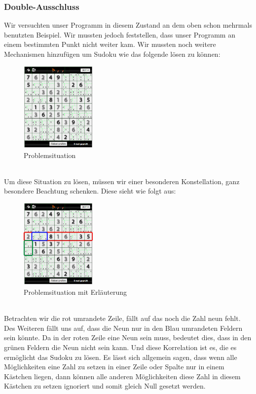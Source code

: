 \documentclass[11pt,a4paper]{article}
\begin{document}
\subsubsection{Double-Ausschluss}
Wir versuchten unser Programm in diesem Zustand an dem oben schon mehrmals benutzten Beispiel. Wir mussten jedoch feststellen, dass unser Programm an einem bestimmten Punkt nicht weiter kam.
Wir mussten noch weitere Mechanismen hinzufügen um Sudoku wie das folgende lösen zu können:
\ \\
\begin{figure}[htbp!]
\begin{center}
\includegraphics[width=0.33\textwidth]{sudoku4.pdf}
\end{center}
\caption{Problemsituation}
\end{figure}
\ \\ 
\newpage
Um diese Situation zu lösen, müssen wir einer besonderen Konstellation, ganz besondere Beachtung schenken. Diese sieht wie folgt aus: 
\ \\
\begin{figure}[htbp!]
\begin{center}
\includegraphics[width=0.33\textwidth]{sudoku5.pdf}
\end{center}
\caption{Problemsituation mit Erläuterung}
\end{figure}
\ \\ 
Betrachten wir die rot umrandete Zeile, fällt auf das noch die Zahl neun fehlt. Des Weiteren fällt uns auf, dass die Neun nur in den Blau umrandeten Feldern sein könnte. Da in der roten Zeile eine Neun sein muss, bedeutet dies, dass in den grünen Feldern die Neun nicht sein kann. Und diese Korrelation ist es, die es ermöglicht das Sudoku zu lösen. Es lässt sich allgemein sagen, dass wenn alle Möglichkeiten eine Zahl zu setzen in einer Zeile oder Spalte nur in einem Kästchen liegen, dann können alle anderen Möglichkeiten diese Zahl in diesem Kästchen zu setzen ignoriert und somit gleich Null gesetzt werden.
\end{document}
